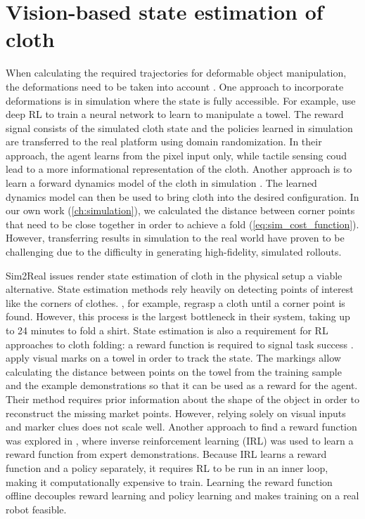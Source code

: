 \documentclass[\home/main.tex]{subfiles}
\begin{document}
\section{Vision-based state estimation of cloth} \label{sec:instrumentation_lit}

When calculating the required trajectories for deformable object manipulation, the deformations need to be taken into account \autocite{Foresti2004}. One approach to incorporate deformations is in simulation where the state is fully accessible.
For example, \textcite{Matas2018} use deep \gls{RL} to train a neural network to learn to manipulate a towel. The reward signal consists of the simulated cloth state and the policies learned in simulation are transferred to the real platform using domain randomization. In their approach, the agent learns from the pixel input only, while tactile sensing coud lead to a more informational representation of the cloth. Another approach is to learn a forward dynamics model of the cloth in simulation \autocite{Tanaka2018}. The learned dynamics model can then be used to bring cloth into the desired configuration. In our own work (\cref{ch:simulation}), we calculated the distance between corner points that need to be close together in order to achieve a fold (\cref{eq:sim_cost_function}). However, transferring results in simulation to the real world have proven to be challenging due to the difficulty in generating high-fidelity, simulated rollouts.

Sim2Real issues render state estimation of cloth in the physical setup a viable alternative.
State estimation methods rely heavily on detecting points of interest like the corners of clothes. \textcite{Maitin2010}, for example, regrasp a cloth until a corner point is found. However, this process is the largest bottleneck in their system, taking up to 24 minutes to fold a shirt.
State estimation is also a requirement for \gls{RL} approaches to cloth folding: a reward function is required to signal task success \autocite{Tsurumine2019, Matas2018}.
\textcite{Balaguer2011} apply visual marks on a towel in order to track the state. The markings allow calculating the distance between points on the towel from the training sample and the example demonstrations so that it can be used as a reward for the agent. Their method requires prior information about the shape of the object in order to reconstruct the missing market points.
However, relying solely on visual inputs and marker clues does not scale well. Another approach to find a reward function was explored in \autocite{Abbeel2004, Finn2016}, where inverse reinforcement learning (IRL) was used to learn a reward function from expert demonstrations. Because IRL learns a reward function and a policy separately, it requires RL to be run in an inner loop, making it computationally expensive to train. Learning the reward function offline decouples reward learning and policy learning and makes training on a real robot feasible.
\end{document}
